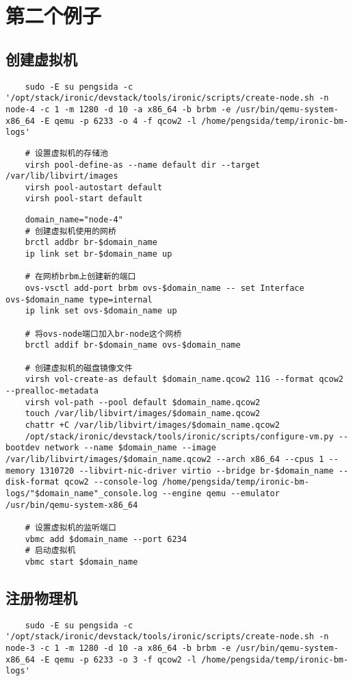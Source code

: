 \documentclass[a4paper,left=1.5cm,right=1.5cm,11pt]{article}
\begin{document}
\section{第二个例子}
\subsection{创建虚拟机}

	\begin{lstlisting}
	sudo -E su pengsida -c '/opt/stack/ironic/devstack/tools/ironic/scripts/create-node.sh -n node-4 -c 1 -m 1280 -d 10 -a x86_64 -b brbm -e /usr/bin/qemu-system-x86_64 -E qemu -p 6233 -o 4 -f qcow2 -l /home/pengsida/temp/ironic-bm-logs'
	\end{lstlisting}

	\begin{lstlisting}
	# 设置虚拟机的存储池
	virsh pool-define-as --name default dir --target /var/lib/libvirt/images
	virsh pool-autostart default
	virsh pool-start default
	\end{lstlisting}

	\begin{lstlisting}
	domain_name="node-4"
	# 创建虚拟机使用的网桥
	brctl addbr br-$domain_name
	ip link set br-$domain_name up

	# 在网桥brbm上创建新的端口
	ovs-vsctl add-port brbm ovs-$domain_name -- set Interface ovs-$domain_name type=internal
	ip link set ovs-$domain_name up

	# 将ovs-node端口加入br-node这个网桥
	brctl addif br-$domain_name ovs-$domain_name

	# 创建虚拟机的磁盘镜像文件
	virsh vol-create-as default $domain_name.qcow2 11G --format qcow2 --prealloc-metadata
	virsh vol-path --pool default $domain_name.qcow2
	touch /var/lib/libvirt/images/$domain_name.qcow2
	chattr +C /var/lib/libvirt/images/$domain_name.qcow2
	/opt/stack/ironic/devstack/tools/ironic/scripts/configure-vm.py --bootdev network --name $domain_name --image /var/lib/libvirt/images/$domain_name.qcow2 --arch x86_64 --cpus 1 --memory 1310720 --libvirt-nic-driver virtio --bridge br-$domain_name --disk-format qcow2 --console-log /home/pengsida/temp/ironic-bm-logs/"$domain_name"_console.log --engine qemu --emulator /usr/bin/qemu-system-x86_64
	
	# 设置虚拟机的监听端口
	vbmc add $domain_name --port 6234
	# 启动虚拟机
	vbmc start $domain_name
	\end{lstlisting}
	
\subsection{注册物理机}
	\begin{lstlisting}
	sudo -E su pengsida -c '/opt/stack/ironic/devstack/tools/ironic/scripts/create-node.sh -n node-3 -c 1 -m 1280 -d 10 -a x86_64 -b brbm -e /usr/bin/qemu-system-x86_64 -E qemu -p 6233 -o 3 -f qcow2 -l /home/pengsida/temp/ironic-bm-logs'
	\end{lstlisting}
\end{document}
